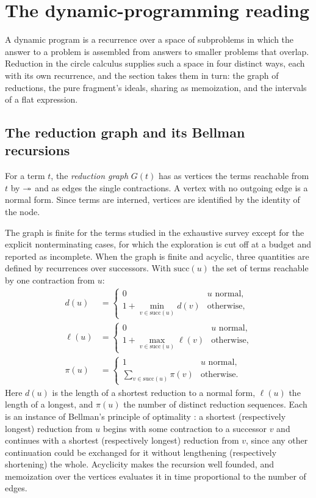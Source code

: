 \section{The dynamic-programming reading}\label{sec:dp}

A dynamic program is a recurrence over a space of subproblems in which the answer to a problem is assembled from answers to smaller problems that overlap. Reduction in the circle calculus supplies such a space in four distinct ways, each with its own recurrence, and the section takes them in turn: the graph of reductions, the pure fragment's ideals, sharing as memoization, and the intervals of a flat expression.

\subsection{The reduction graph and its Bellman recursions}

\begin{definition}
For a term $t$, the \emph{reduction graph} $G(t)$ has as vertices the terms reachable from $t$ by $\twoheadrightarrow$ and as edges the single contractions. A vertex with no outgoing edge is a normal form. Since terms are interned, vertices are identified by the identity of the node.
\end{definition}

The graph is finite for the terms studied in the exhaustive survey except for the explicit nonterminating cases, for which the exploration is cut off at a budget and reported as incomplete. When the graph is finite and acyclic, three quantities are defined by recurrences over successors. With $\mathrm{succ}(u)$ the set of terms reachable by one contraction from $u$:
\begin{align*}
d(u)&=\begin{cases}0&u\text{ normal},\\ 1+\min_{v\in\mathrm{succ}(u)}d(v)&\text{otherwise,}\end{cases}\\
\ell(u)&=\begin{cases}0&u\text{ normal},\\ 1+\max_{v\in\mathrm{succ}(u)}\ell(v)&\text{otherwise,}\end{cases}\\
\pi(u)&=\begin{cases}1&u\text{ normal},\\ \sum_{v\in\mathrm{succ}(u)}\pi(v)&\text{otherwise.}\end{cases}
\end{align*}
Here $d(u)$ is the length of a shortest reduction to a normal form, $\ell(u)$ the length of a longest, and $\pi(u)$ the number of distinct reduction sequences. Each is an instance of Bellman's principle of optimality \cite{bellman}: a shortest (respectively longest) reduction from $u$ begins with some contraction to a successor $v$ and continues with a shortest (respectively longest) reduction from $v$, since any other continuation could be exchanged for it without lengthening (respectively shortening) the whole. Acyclicity makes the recursion well founded, and memoization over the vertices evaluates it in time proportional to the number of edges.

